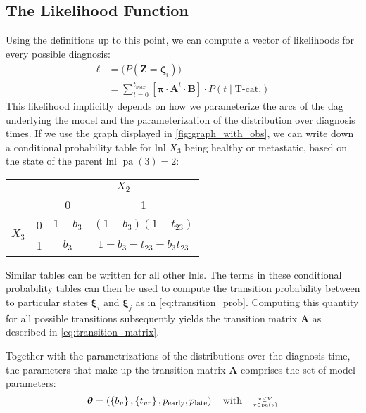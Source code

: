 \documentclass[twocolumn]{aastex631}
\begin{document}
\subsection{The Likelihood Function}
\label{subsec:previous_work:likelihood}

Using the definitions up to this point, we can compute a vector of likelihoods for every possible diagnosis:
%
\begin{equation} \label{eq:likelihood_vec}
\begin{split}
    \boldsymbol{\ell} &= \big( P\left( \mathbf{Z} = \boldsymbol{\zeta}_i \right) \big) \\
    &= \sum_{t=0}^{t_{max}} \left[ \boldsymbol{\pi} \cdot \mathbf{A}^t \cdot \mathbf{B} \right] \cdot P \left( t \mid \text{T-cat.} \right)
\end{split}
\end{equation}
%
This likelihood implicitly depends on how we parameterize the arcs of the \gls{dag} underlying the model and the parameterization of the distribution over diagnosis times. If we use the graph displayed in \cref{fig:graph_with_obs}, we can write down a conditional probability table for \gls{lnl} $X_3$ being healthy or metastatic, based on the state of the parent \gls{lnl} $\operatorname{pa}(3) = 2$:

\noindent
\begin{center}
    \begin{tabular}{|cc|cc|}
        \hline
        & & \multicolumn{2}{c|}{$X_2$} \\
        & & 0 & 1 \\
        \hline
        \multirow{2}{*}{$X_3$} & 0 & $1 - b_3$ & $(1 - b_3)(1 - t_{23})$ \\
        & 1 & $b_3$ & $1 - b_3 - t_{23} + b_3 t_{23}$ \\
        \hline
    \end{tabular}
\end{center}

Similar tables can be written for all other \glspl{lnl}. The terms in these conditional probability tables can then be used to compute the transition probability between to particular states $\boldsymbol{\xi}_i$ and $\boldsymbol{\xi}_j$ as in \cref{eq:transition_prob}. Computing this quantity for all possible transitions subsequently yields the transition matrix $\mathbf{A}$ as described in \cref{eq:transition_matrix}.

Together with the parametrizations of the distributions over the diagnosis time, the parameters that make up the transition matrix $\mathbf{A}$ comprises the set of model parameters:
%
\begin{equation}
    \boldsymbol{\theta} = \left( \left\{ b_v \right\}, \left\{ t_{vr} \right\}, p_\text{early}, p_\text{late} \right) \quad \text{with} \quad \genfrac{}{}{0pt}{2}{v\leq V}{r\in\operatorname{pa}(v)}
\end{equation}
\end{document}
